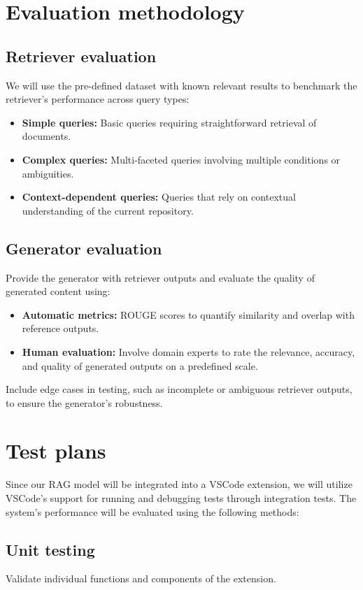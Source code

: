 \section{Evaluation methodology}

\subsection{Retriever evaluation}
We will use the pre-defined dataset with known relevant results to benchmark the retriever's performance across query types:
\begin{itemize}
    \item \textbf{Simple queries:} Basic queries requiring straightforward retrieval of documents.
    \item \textbf{Complex queries:} Multi-faceted queries involving multiple conditions or ambiguities.
    \item \textbf{Context-dependent queries:} Queries that rely on contextual understanding of the current repository.
\end{itemize}

\subsection{Generator evaluation}
Provide the generator with retriever outputs and evaluate the quality of generated content using:
    \begin{itemize}
        \item \textbf{Automatic metrics:} ROUGE scores to quantify similarity and overlap with reference outputs.
        \item \textbf{Human evaluation:} Involve domain experts to rate the relevance, accuracy, and quality of generated outputs on a predefined scale.
    \end{itemize}
    
    Include edge cases in testing, such as incomplete or ambiguous retriever outputs, to ensure the generator’s robustness.

\section{Test plans}
Since our RAG model will be integrated into a VSCode extension, we will utilize VSCode's support for running and debugging tests through integration tests. The system's performance will be evaluated using the following methods:
\subsection{Unit testing} Validate individual functions and components of the extension.

